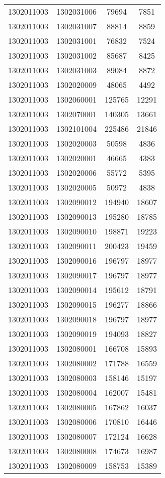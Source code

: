 \begin{longtable}{llcc}
1302011003 & 1302031006 & 79694 & 7851\\
1302011003 & 1302031007 & 88814 & 8859\\
1302011003 & 1302031001 & 76832 & 7524\\
1302011003 & 1302031002 & 85687 & 8425\\
1302011003 & 1302031003 & 89084 & 8872\\
1302011003 & 1302020009 & 48065 & 4492\\
1302011003 & 1302060001 & 125765 & 12291\\
1302011003 & 1302070001 & 140305 & 13661\\
1302011003 & 1302101004 & 225486 & 21846\\
1302011003 & 1302020003 & 50598 & 4836\\
1302011003 & 1302020001 & 46665 & 4383\\
1302011003 & 1302020006 & 55772 & 5395\\
1302011003 & 1302020005 & 50972 & 4838\\
1302011003 & 1302090012 & 194940 & 18607\\
1302011003 & 1302090013 & 195280 & 18785\\
1302011003 & 1302090010 & 198871 & 19223\\
1302011003 & 1302090011 & 200423 & 19459\\
1302011003 & 1302090016 & 196797 & 18977\\
1302011003 & 1302090017 & 196797 & 18977\\
1302011003 & 1302090014 & 195612 & 18791\\
1302011003 & 1302090015 & 196277 & 18866\\
1302011003 & 1302090018 & 196797 & 18977\\
1302011003 & 1302090019 & 194093 & 18827\\
1302011003 & 1302080001 & 166708 & 15893\\
1302011003 & 1302080002 & 171788 & 16559\\
1302011003 & 1302080003 & 158146 & 15197\\
1302011003 & 1302080004 & 162007 & 15481\\
1302011003 & 1302080005 & 167862 & 16037\\
1302011003 & 1302080006 & 170810 & 16446\\
1302011003 & 1302080007 & 172124 & 16628\\
1302011003 & 1302080008 & 174673 & 16987\\
1302011003 & 1302080009 & 158753 & 15389\\

\end{longtable}
